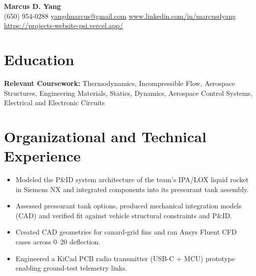 \newcommand{\entrygap}{\vspace{2pt}}



\begin{center}
  {\fontsize{17}{20}\selectfont\bfseries Marcus D. Yang}\\[2pt]
  {\footnotesize (650) 954-0288 \textbar{} \href{mailto:yangdmarcus@gmail.com}{yangdmarcus@gmail.com} \textbar{} \href{https://www.linkedin.com/in/marcusdyang}{www.linkedin.com/in/marcusdyang} \textbar{} \href{https://projects-website-psi.vercel.app/}{https://projects-website-psi.vercel.app/}}
\end{center}

\section{Education}
\textbf{Relevant Coursework:} Thermodynamics, Incompressible Flow, Aerospace Structures, Engineering Materials, Statics, Dynamics, Aerospace Control Systems, Electrical and Electronic Circuits

\section{Organizational and Technical Experience}

\begin{itemize}
  \item Modeled the P\&ID system architecture of the team's IPA/LOX liquid rocket in Siemens NX and integrated components into its pressurant tank assembly.
  \item Assessed pressurant tank options, produced mechanical integration models (CAD) and verified fit against vehicle structural constraints and P\&ID.
  \item Created CAD geometries for canard-grid fins and ran Ansys Fluent CFD cases across 0--20\textdegree{} deflection.
  \item Engineered a KiCad PCB radio transmitter (USB-C + MCU) prototype enabling ground-test telemetry links.
\end{itemize}
\entrygap

